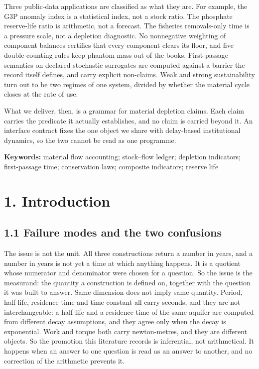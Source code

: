 \documentclass[11pt]{article}
\begin{document}
Three public-data applications are classified as what they are. For example, the G3P anomaly index is a statistical index, not a stock ratio. The phosphate reserve-life ratio is arithmetic, not a forecast. The fisheries removals-only time is a pressure scale, not a depletion diagnostic. No nonnegative weighting of component balances certifies that every component clears its floor, and five double-counting rules keep phantom mass out of the books. First-passage semantics on declared stochastic surrogates are computed against a barrier the record itself defines, and carry explicit non-claims. Weak and strong sustainability turn out to be two regimes of one system, divided by whether the material cycle closes at the rate of use.

What we deliver, then, is a grammar for material depletion claims. Each claim carries the predicate it actually establishes, and no claim is carried beyond it. An interface contract fixes the one object we share with delay-based institutional dynamics, so the two cannot be read as one programme.

\textbf{Keywords:} material flow accounting; stock--flow ledger; depletion indicators; first-passage time; conservation laws; composite indicators; reserve life

\vspace{0.8em}

\section*{1. Introduction}\label{1-introduction}

\subsection*{1.1 Failure modes and the two confusions}\label{11-failure-modes-and-the-two-confusions}

The issue is not the unit. All three constructions return a number in years, and a number in years is not yet a time at which anything happens. It is a quotient whose numerator and denominator were chosen for a question. So the issue is the measurand: the quantity a construction is defined on, together with the question it was built to answer. Same dimension does not imply same quantity. Period, half-life, residence time and time constant all carry seconds, and they are not interchangeable: a half-life and a residence time of the same aquifer are computed from different decay assumptions, and they agree only when the decay is exponential. Work and torque both carry newton-metres, and they are different objects. So the promotion this literature records is inferential, not arithmetical. It happens when an answer to one question is read as an answer to another, and no correction of the arithmetic prevents it.
\end{document}
